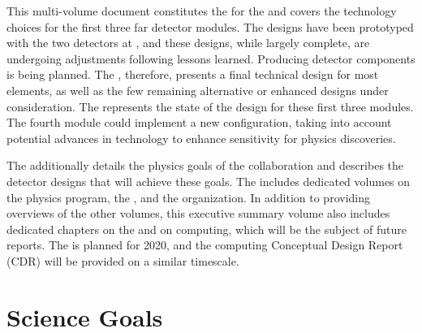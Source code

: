 This multi-volume document constitutes the  for the   and covers the technology choices for the first three far detector modules. The   designs have been prototyped with the two  detectors at , and these designs, while largely complete, are undergoing adjustments following lessons learned. Producing detector components is being planned. The  , therefore, presents a final technical design for most elements, as well as the few remaining alternative or enhanced designs under consideration. The  represents the state of the design for these first three   modules. The fourth module could implement a new  configuration, taking into account  potential advances in technology to enhance sensitivity for physics discoveries. 

The  additionally details the physics goals of the  collaboration and describes the detector designs that will achieve these goals. The  includes dedicated volumes on the  physics program, the  , and the   organization. In addition to providing overviews of the other volumes, this executive summary volume also includes dedicated chapters on the  and on computing, which will be the subject of future reports. The   is planned for 2020, and the computing Conceptual Design Report (CDR) will be provided on a similar timescale.

\section{Science Goals}

